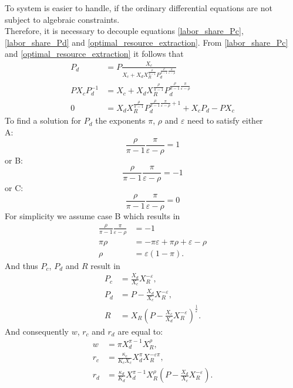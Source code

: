 To system is easier to handle, if the ordinary differential equations are not subject to algebraic constraints. \\
Therefore, it is necessary to decouple equations \eqref{labor_share_Pc}, \eqref{labor_share_Pd} and \eqref{optimal_resource_extraction}.
From \eqref{labor_share_Pc} and \eqref{optimal_resource_extraction} it follows that
\begin{align}
	P_d &= P\frac{X_c}{X_c + X_d X_R^{\frac{\rho}{\pi-1}}P_d^{\frac{\rho}{\pi-1}\frac{\pi}{\varepsilon-\rho}}} \\
	P X_c P_d^{-1} &= X_c + X_d X_R^{\frac{\rho}{\pi-1}}P_d^{\frac{\rho}{\pi-1}\frac{\pi}{\varepsilon-\rho}} \\
	0 &= X_d X_R^{\frac{\rho}{\pi-1}}P_d^{\frac{\rho}{\pi-1}\frac{\pi}{\varepsilon-\rho}+1} + X_c P_d - P X_c
\end{align}
To find a solution for $P_d$ the exponents $\pi$, $\rho$ and $\varepsilon$ need to satisfy either \\
A:
\begin{equation}
	\frac{\rho}{\pi-1}\frac{\pi}{\varepsilon-\rho} = 1
\end{equation}
or B:
\begin{equation}
	\frac{\rho}{\pi-1}\frac{\pi}{\varepsilon-\rho}= -1
\end{equation}
or C:
\begin{equation}
	\frac{\rho}{\pi-1}\frac{\pi}{\varepsilon-\rho}= 0
\end{equation}
For simplicity we assume case B which results in
\begin{align}
	\frac{\rho}{\pi-1}\frac{\pi}{\varepsilon-\rho} &= -1 \\
	\pi \rho &= -\pi\varepsilon + \pi\rho + \varepsilon - \rho \\
	\rho &= \varepsilon(1-\pi).
\end{align}
And thus $P_c$, $P_d$ and $R$ result in
\begin{align}
	P_c &= \frac{X_d }{X_c}X_R ^{-\varepsilon}, \\
	P_d &= P - \frac{X_d }{X_c}X_R ^{-\varepsilon}, \\
	R &= X_R \left( P-\frac{X_c}{X_d} X_R^{-\varepsilon} \right)^{\frac{1}{\varepsilon}}.
	\label{input_share_solution_IIb}
\end{align}
And consequently $w$, $r_c$ and $r_d$ are equal to:
\begin{align}
	w &= \pi X_d^{\pi-1} X_R ^{\rho}, \\
	r_c &= \frac{\kappa_c}{K_c X_c}X_d^{\pi}X_R^{-\varepsilon \pi}, \\
	r_d &= \frac{\kappa_d}{K_d}X_d^{\pi-1}X_R^{\rho}\left( P -\frac{X_d}{X_c}X_R^{-\varepsilon}\right).
\end{align}

